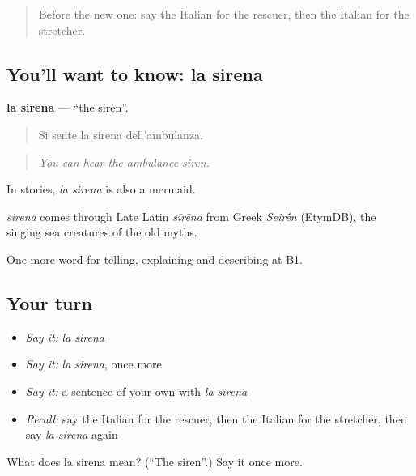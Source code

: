 \label{lesson:IT-C301-sirena}



\begin{quote}
Before the new one: say the Italian for the rescuer, then the Italian for the stretcher.
\end{quote}

\subsection*{You'll want to know: la sirena}
\textbf{la sirena} — \textquotedblleft{}the siren\textquotedblright{}.

\begin{quote}
Si sente la sirena dell'ambulanza.
\end{quote}

\begin{quote}
\emph{You can hear the ambulance siren.}
\end{quote}

In stories, \emph{la sirena} is also a mermaid.

\begin{cousinweb}
\emph{sirena} comes through Late Latin \emph{sīrēna} from Greek \emph{Seir\'{\={e}}n} (EtymDB), the singing sea creatures of the old myths.
\end{cousinweb}

\begin{grammarlens}[title={What you've built}]
One more word for telling, explaining and describing at B1.
\end{grammarlens}

\subsection*{Your turn}
\begin{itemize}
\raggedright
  \item \emph{Say it:} \emph{la sirena}
  \item \emph{Say it:} \emph{la sirena}, once more
  \item \emph{Say it:} a sentence of your own with \emph{la sirena}
  \item \emph{Recall:} say the Italian for the rescuer, then the Italian for the stretcher, then say \emph{la sirena} again
\end{itemize}

\begin{tcolorbox}[breakable,colback=teal!4,colframe=teal!35!black,title={Before you move on}]
What does la sirena mean? (\textquotedblleft{}The siren\textquotedblright{}.) Say it once more.
\end{tcolorbox}
